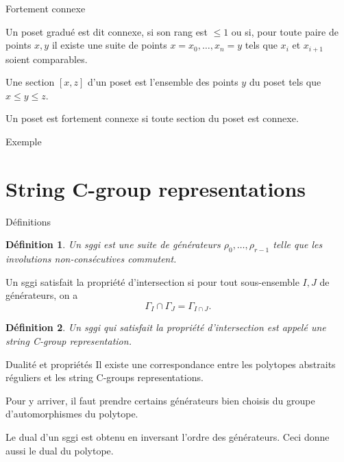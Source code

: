 \documentclass[10pt]{beamer}
\newtheorem{definition}{Définition}[section]
\begin{document}
\begin{frame}{Fortement connexe}

  Un poset gradué est dit connexe, si son rang est $\le 1$ ou si, pour toute paire de points $x, y$ il existe une suite de points $x = x_0, \dots, x_n = y$ tels que $x_i$ et $x_{i+1}$ soient comparables.

  Une section $[x,z]$ d'un poset est l'ensemble des points $y$ du poset tels que  $x \le y \le z$.

  Un poset est fortement connexe si toute section du poset est connexe.

\end{frame}

\begin{frame}{Exemple}
  \begin{figure}[H]
    \begin{center}
      \def\svgwidth{.5\columnwidth}
      
    \end{center}
  \end{figure}
\end{frame}

\section{String C-group representations}

\begin{frame}{Définitions}
  \begin{definition}
    Un sggi est une suite de générateurs $\rho_0, \dots, \rho_{r-1}$ telle que les involutions non-consécutives commutent.
  \end{definition}


    Un sggi satisfait la propriété d'intersection si pour tout sous-ensemble $I, J$ de générateurs, on a
    \[
      \Gamma_{I} \cap \Gamma_{J} = \Gamma_{I \cap J}.
    \]

  \begin{definition}
    Un sggi qui satisfait la propriété d'intersection est appelé une string C-group representation.
  \end{definition}
\end{frame}

\begin{frame}{Dualité et propriétés}
  Il existe une correspondance entre les polytopes abstraits réguliers et les string C-groups representations.

  Pour y arriver, il faut prendre certains générateurs bien choisis du groupe d'automorphismes du polytope.

  Le dual d'un sggi est obtenu en inversant l'ordre des générateurs. Ceci donne aussi le dual du polytope.
\end{frame}
\end{document}
